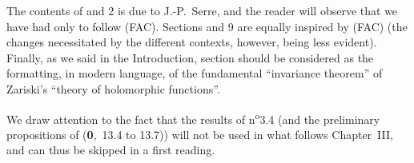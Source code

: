 The contents of \textsection{} and 2 is due to J.-P.~Serre, and the reader will observe that we have had only to follow (FAC).
Sections  and 9 are equally inspired by (FAC) (the changes necessitated by the different contexts, however, being less evident).
Finally, as we said in the Introduction, section  should be considered as the formatting, in modern language, of the fundamental ``invariance theorem'' of Zariski's ``theory of holomorphic functions''.

We draw attention to the fact that the results of n\textsuperscript{o}3.4 (and the preliminary propositions of (\textbf{0},~13.4 to 13.7)) will not be used in what follows Chapter~III, and can thus be skipped in a first reading.
\bigskip




% 
% 
% 
% 






